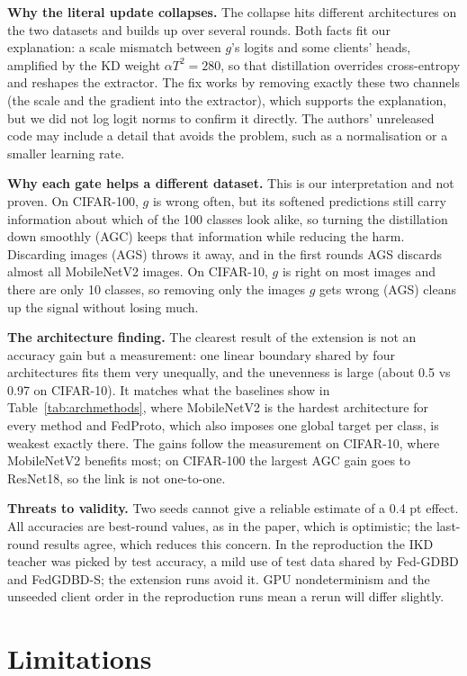 \textbf{Why the literal update collapses.} The collapse hits different architectures on the two datasets and builds up over several rounds. Both facts fit our explanation: a scale mismatch between $g$'s logits and some clients' heads, amplified by the KD weight $\alpha T^2 = 280$, so that distillation overrides cross-entropy and reshapes the extractor. The fix works by removing exactly these two channels (the scale and the gradient into the extractor), which supports the explanation, but we did not log logit norms to confirm it directly. The authors' unreleased code may include a detail that avoids the problem, such as a normalisation or a smaller learning rate.

\textbf{Why each gate helps a different dataset.} This is our interpretation and not proven. On CIFAR-100, $g$ is wrong often, but its softened predictions still carry information about which of the 100 classes look alike, so turning the distillation down smoothly (AGC) keeps that information while reducing the harm. Discarding images (AGS) throws it away, and in the first rounds AGS discards almost all MobileNetV2 images. On CIFAR-10, $g$ is right on most images and there are only 10 classes, so removing only the images $g$ gets wrong (AGS) cleans up the signal without losing much.

\textbf{The architecture finding.} The clearest result of the extension is not an accuracy gain but a measurement: one linear boundary shared by four architectures fits them very unequally, and the unevenness is large (about 0.5 vs 0.97 on CIFAR-10). It matches what the baselines show in Table~\ref{tab:archmethods}, where MobileNetV2 is the hardest architecture for every method and FedProto, which also imposes one global target per class, is weakest exactly there. The gains follow the measurement on CIFAR-10, where MobileNetV2 benefits most; on CIFAR-100 the largest AGC gain goes to ResNet18, so the link is not one-to-one.

\textbf{Threats to validity.} Two seeds cannot give a reliable estimate of a 0.4 pt effect. All accuracies are best-round values, as in the paper, which is optimistic; the last-round results agree, which reduces this concern. In the reproduction the IKD teacher was picked by test accuracy, a mild use of test data shared by Fed-GDBD and FedGDBD-S; the extension runs avoid it. GPU nondeterminism and the unseeded client order in the reproduction runs mean a rerun will differ slightly.

\section{Limitations}

